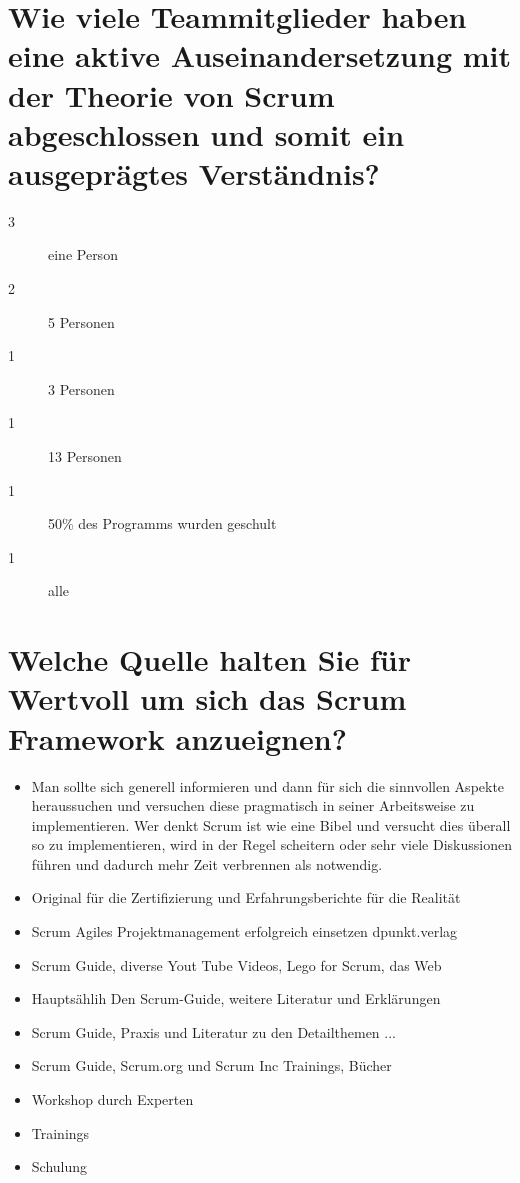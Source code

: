 \section*{Wie viele Teammitglieder haben eine aktive Auseinandersetzung mit der Theorie von Scrum abgeschlossen und somit ein ausgeprägtes Verständnis?}
\begin{description}
    \item[3 \responsecount] eine Person
    \item[2 \responsecount] 5 Personen
    \item[1 \responsecount] 3 Personen
    \item[1 \responsecount] 13 Personen
    \item[1 \responsecount] 50\% des Programms wurden geschult
    \item[1 \responsecount] alle
\end{description}

\section*{Welche Quelle halten Sie für Wertvoll um sich das Scrum Framework anzueignen?}
\begin{itemize}
    \item[\openresponse] Man sollte sich generell informieren und dann für sich die sinnvollen Aspekte heraussuchen und versuchen diese pragmatisch in seiner Arbeitsweise zu implementieren. Wer denkt Scrum ist wie eine Bibel und versucht dies überall so zu implementieren, wird in der Regel scheitern oder sehr viele Diskussionen führen und dadurch mehr Zeit verbrennen als notwendig.
    \item[\openresponse] Original für die Zertifizierung und Erfahrungsberichte für die Realität
    \item[\openresponse] Scrum Agiles Projektmanagement erfolgreich einsetzen dpunkt.verlag
    \item[\openresponse] Scrum Guide, diverse Yout Tube Videos, Lego for Scrum, das Web
    \item[\openresponse] Hauptsählih Den Scrum-Guide, weitere Literatur und Erklärungen
    \item[\openresponse] Scrum Guide, Praxis und Literatur zu den Detailthemen ...
    \item[\openresponse] Scrum Guide, Scrum.org und Scrum Inc Trainings, Bücher
    \item[\openresponse] Workshop durch Experten
    \item[\openresponse] Trainings
    \item[\openresponse] Schulung
\end{itemize}

